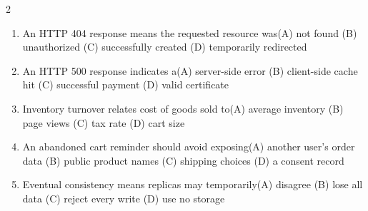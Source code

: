 \documentclass[a4paper]{article}
\begin{document}
\begin{multicols*}{2}
\begin{enumerate}[resume]
\item An HTTP 404 response means the requested resource was\newline\hspace*{0.6em}(A) not found \quad (B) unauthorized \newline\hspace*{0.6em}(C) successfully created \quad (D) temporarily redirected
\item An HTTP 500 response indicates a\newline\hspace*{0.6em}(A) server-side error \quad (B) client-side cache hit \newline\hspace*{0.6em}(C) successful payment \quad (D) valid certificate
\item Inventory turnover relates cost of goods sold to\newline\hspace*{0.6em}(A) average inventory \quad (B) page views \newline\hspace*{0.6em}(C) tax rate \quad (D) cart size
\item An abandoned cart reminder should avoid exposing\newline\hspace*{0.6em}(A) another user's order data \quad (B) public product names \newline\hspace*{0.6em}(C) shipping choices \quad (D) a consent record
\item Eventual consistency means replicas may temporarily\newline\hspace*{0.6em}(A) disagree \quad (B) lose all data \newline\hspace*{0.6em}(C) reject every write \quad (D) use no storage
\end{enumerate}
\end{multicols*}
\end{document}
